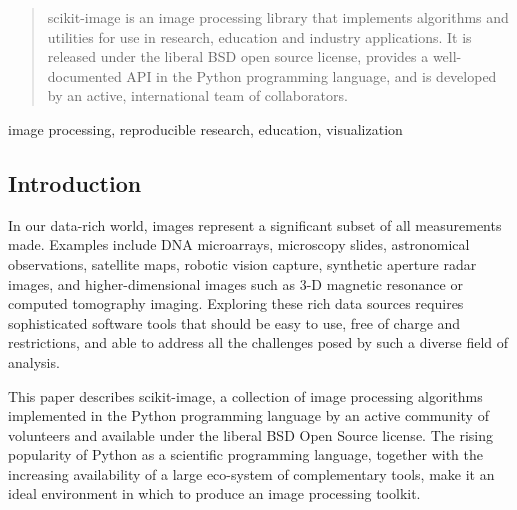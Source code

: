 \documentclass[letterpaper,compsoc,twoside]{IEEEtran}
\begin{document}
\newcommand*{\docutilsroleref}{\ref}
\newcommand*{\docutilsrolelabel}{\label}
\begin{abstract}scikit-image is an image processing library that implements algorithms
and utilities for use in research, education and industry applications.  It
is released under the liberal BSD open source license, provides a well-
documented API in the Python programming language, and is developed by an
active, international team of collaborators.\end{abstract}\begin{IEEEkeywords}image processing, reproducible research, education, visualization\end{IEEEkeywords}

\subsection{Introduction%
  \label{introduction}%
}


In our data-rich world, images represent a significant subset of all
measurements made. Examples include DNA microarrays, microscopy slides,
astronomical observations, satellite maps, robotic vision capture, synthetic
aperture radar images, and higher-dimensional images such as 3-D magnetic
resonance or computed tomography imaging. Exploring these rich data sources
requires sophisticated software tools that should be easy to use, free of
charge and restrictions, and able to address all the challenges posed by such a
diverse field of analysis.

This paper describes scikit-image, a collection of image processing algorithms
implemented in the Python programming language by an active community of
volunteers and available under the liberal BSD Open Source license.
The rising popularity of Python as a scientific programming language,
together with the increasing availability of a large eco-system of
complementary tools, make it an ideal environment in which to produce
an image processing toolkit.
\end{document}
